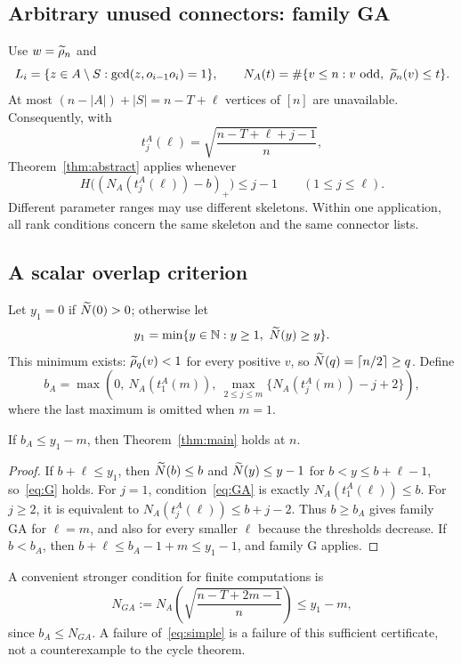 \subsection{Arbitrary unused connectors: family GA}
Use $w=\widetilde\rho_n$ and
\[
 L_i=\{z\in A\setminus S:\gcd(z,o_{i-1}o_i)=1\},\qquad
 N_A(t)=\#\{v\le n:v\text{ odd},\ \widetilde\rho_n(v)\le t\}.
\]
At most $(n-|A|)+|S|=n-T+\ell$ vertices of $[n]$ are unavailable. Consequently, with
\[
 t_j^A(\ell)=\sqrt{\frac{n-T+\ell+j-1}{n}},
\]
Theorem~\ref{thm:abstract} applies whenever
\begin{equation}\label{eq:GA}
 H\bigl((N_A(t_j^A(\ell))-b)_+\bigr)\le j-1
 \qquad(1\le j\le\ell).
\end{equation}
Different parameter ranges may use different skeletons. Within one application, all rank conditions concern the same skeleton and the same connector lists.

\subsection{A scalar overlap criterion}
Let $y_1=0$ if $\widetilde N(0)>0$; otherwise let
\[
 y_1=\min\{y\in\mathbb N:y\ge1,\ \widetilde N(y)\ge y\}.
\]
This minimum exists: $\widetilde\rho_q(v)<1$ for every positive $v$, so $\widetilde N(q)=\lceil n/2\rceil\ge q$.
Define
\begin{equation}\label{eq:bA}
b_A=\max\left(0,\ N_A(t_1^A(m)),\
       \max_{2\le j\le m}\{N_A(t_j^A(m))-j+2\}\right),
\end{equation}
where the last maximum is omitted when $m=1$.

\begin{theorem}[G/GA overlap]\label{thm:G}
If $b_A\le y_1-m$, then Theorem~\ref{thm:main} holds at $n$.
\end{theorem}
\begin{proof}
If $b+\ell\le y_1$, then $\widetilde N(b)\le b$ and
$\widetilde N(y)\le y-1$ for $b<y\le b+\ell-1$, so~\eqref{eq:G} holds.
For $j=1$, condition~\eqref{eq:GA} is exactly $N_A(t_1^A(\ell))\le b$. For $j\ge2$, it is equivalent to $N_A(t_j^A(\ell))\le b+j-2$. Thus $b\ge b_A$ gives family GA for $\ell=m$, and also for every smaller $\ell$ because the thresholds decrease. If $b<b_A$, then
$b+\ell\le b_A-1+m\le y_1-1$, and family G applies.
\end{proof}
A convenient stronger condition for finite computations is
\begin{equation}\label{eq:simple}
N_{GA}:=N_A\left(\sqrt{\frac{n-T+2m-1}{n}}\right)\le y_1-m,
\end{equation}
since $b_A\le N_{GA}$. A failure of~\eqref{eq:simple} is a failure of this sufficient certificate, not a counterexample to the cycle theorem.

